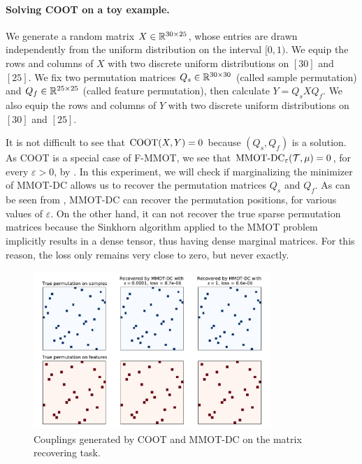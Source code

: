 \paragraph{Solving COOT on a toy example.} We generate a random matrix $X \in \mathbb R^{30 \times 25}$, whose entries are drawn independently
from the uniform distribution on the interval $[0,1)$. We equip the rows and columns of $X$ with two discrete uniform distributions
on $[30]$ and $[25]$. We fix two permutation matrices $Q_s \in \mathbb R^{30 \times 30}$ (called sample permutation) and
$Q_f \in \mathbb R^{25 \times 25}$ (called feature permutation), then calculate $Y = Q_s X Q_f$. We also equip the rows and columns of $Y$
with two discrete uniform distributions on $[30]$ and $[25]$.

It is not difficult to see that $\text{COOT}(X,Y) = 0$ because $(Q_s, Q_f)$ is a solution. As COOT is a special case of F-MMOT,
we see that $\text{MMOT-DC}_{\varepsilon}(\mathcal T, \mu) = 0$, for every $\varepsilon > 0$,
by . In this experiment, we will check if marginalizing the minimizer of MMOT-DC allows us to recover
the permutation matrices $Q_s$ and $Q_f$.
As can be seen from , MMOT-DC can recover the permutation positions, for various
values of $\varepsilon$. On the other hand, it can not recover the true sparse permutation matrices because the Sinkhorn algorithm
applied to the MMOT problem implicitly results in a dense tensor, thus having dense marginal matrices. For this reason,
the loss only remains very close to zero, but never exactly.
\begin{figure}[t]
  \centering
  \includegraphics[width=0.8\textwidth,height=0.8\textheight,keepaspectratio]{./Chapitre2/fig/compare_methods.pdf}
  \caption{Couplings generated by COOT and MMOT-DC on the matrix recovering task.}
  \label{fig:permu}
\end{figure}
